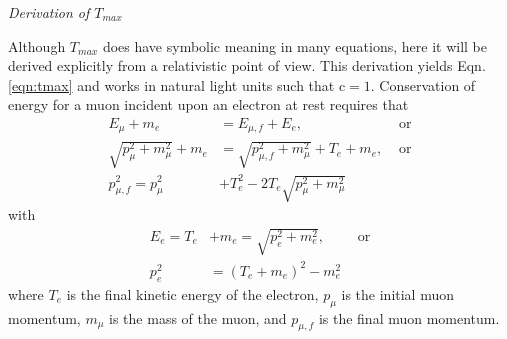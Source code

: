 \vspace{24pt}
\noindent \textit{\large{Derivation of $T_{max}$}}
\vspace{12pt}

Although $T_{max}$ does have symbolic meaning in many equations, here it will be derived explicitly from a relativistic point of view. This derivation yields Eqn. \ref{eqn:tmax} and works in natural light units such that $\text{c}=1$. Conservation of energy for a muon incident upon an electron at rest requires that 
\begin{align}
E_\mu+m_e&=E_{\mu,f}+E_e,&\text{ or} \nonumber\\
\sqrt{p_\mu ^2+m_\mu ^2}+m_e &= \sqrt{p_{\mu,f}^2+m_\mu ^2}+T_e+m_e,&\text{ or} \nonumber \\
p_{\mu,f}^2 =p_\mu^2 &+T_e^2-2T_e\sqrt{p_\mu ^2 + m_\mu^2} \label{eqn:TMaxEnergy1}
\end{align}
with
\begin{align}
E_e=T_e&+m_e = \sqrt{p_e ^2+m_e^2},\qquad\text{ or} \nonumber\\
p_e ^2&=(T_e+m_e)^2-m_e^2 \label{eqn:TMaxEnergy2}
\end{align}
where $T_e$ is the final kinetic energy of the electron, $p_\mu$ is the initial muon momentum, $m_\mu$ is the mass of the muon, and $p_{\mu,f}$ is the final muon momentum. 


